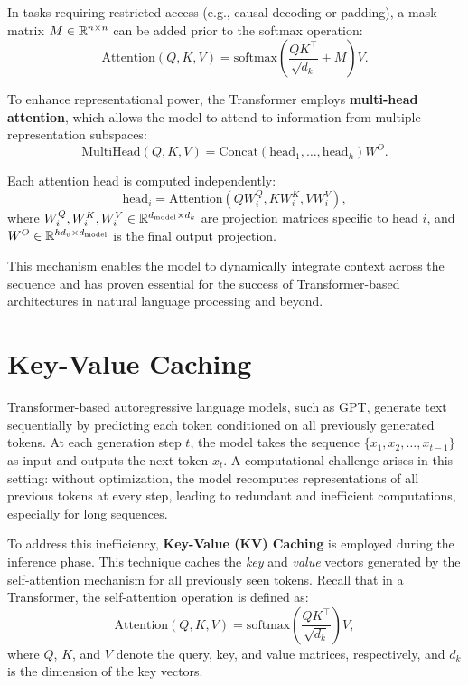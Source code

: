 In tasks requiring restricted access (e.g., causal decoding or padding), a mask matrix \(M \in \mathbb{R}^{n \times n}\) can be added prior to the softmax operation:
\begin{equation*}
	\text{Attention}(Q, K, V) = \text{softmax}\left( \frac{QK^\top}{\sqrt{d_k}} + M \right)V.
\end{equation*}

To enhance representational power, the Transformer employs \textbf{multi-head attention}, which allows the model to attend to information from multiple representation subspaces:
\begin{equation}
	\text{MultiHead}(Q, K, V) = \text{Concat}(\text{head}_1, \dots, \text{head}_h) W^O.
\end{equation}

Each attention head is computed independently:
\begin{equation}
	\text{head}_i = \text{Attention}(Q W_i^Q, K W_i^K, V W_i^V),
\end{equation}
where \(W_i^Q, W_i^K, W_i^V \in \mathbb{R}^{d_{\text{model}} \times d_k}\) are projection matrices specific to head \(i\), and \(W^O \in \mathbb{R}^{hd_v \times d_{\text{model}}}\) is the final output projection.

This mechanism enables the model to dynamically integrate context across the sequence and has proven essential for the success of Transformer-based architectures in natural language processing and beyond.

\section{Key-Value Caching}\label{sec:kv-caching}

Transformer-based autoregressive language models, such as GPT, generate text sequentially by predicting each token conditioned on all previously generated tokens. At each generation step \(t\), the model takes the sequence \(\{x_1, x_2, \dots, x_{t-1}\}\) as input and outputs the next token \(x_t\). A computational challenge arises in this setting: without optimization, the model recomputes representations of all previous tokens at every step, leading to redundant and inefficient computations, especially for long sequences.

To address this inefficiency, \textbf{Key-Value (KV) Caching} is employed during the inference phase. This technique caches the \textit{key} and \textit{value} vectors generated by the self-attention mechanism for all previously seen tokens. Recall that in a Transformer, the self-attention operation is defined as:
\begin{equation*}
	\mathrm{Attention}(Q, K, V) = \mathrm{softmax}\left(\frac{QK^\top}{\sqrt{d_k}}\right)V,
\end{equation*}
where \(Q\), \(K\), and \(V\) denote the query, key, and value matrices, respectively, and \(d_k\) is the dimension of the key vectors.

